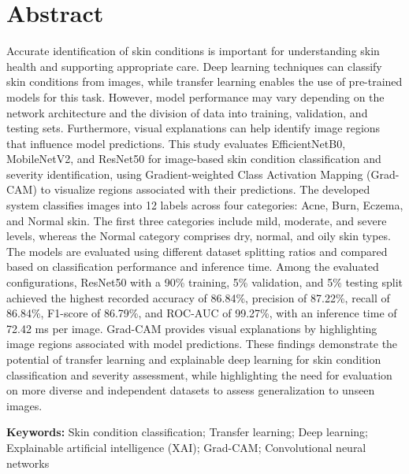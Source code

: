 \section*{Abstract}
Accurate identification of skin conditions is important for understanding skin health and supporting appropriate care. Deep learning techniques can classify skin conditions from images, while transfer learning enables the use of pre-trained models for this task. However, model performance may vary depending on the network architecture and the division of data into training, validation, and testing sets. Furthermore, visual explanations can help identify image regions that influence model predictions. This study evaluates EfficientNetB0, MobileNetV2, and ResNet50 for image-based skin condition classification and severity identification, using Gradient-weighted Class Activation Mapping (Grad-CAM) to visualize regions associated with their predictions. The developed system classifies images into 12 labels across four categories: Acne, Burn, Eczema, and Normal skin. The first three categories include mild, moderate, and severe levels, whereas the Normal category comprises dry, normal, and oily skin types. The models are evaluated using different dataset splitting ratios and compared based on classification performance and inference time. Among the evaluated configurations, ResNet50 with a 90\% training, 5\% validation, and 5\% testing split achieved the highest recorded accuracy of 86.84\%, precision of 87.22\%, recall of 86.84\%, F1-score of 86.79\%, and ROC-AUC of 99.27\%, with an inference time of 72.42 ms per image. Grad-CAM provides visual explanations by highlighting image regions associated with model predictions. These findings demonstrate the potential of transfer learning and explainable deep learning for skin condition classification and severity assessment, while highlighting the need for evaluation on more diverse and independent datasets to assess generalization to unseen images.
\\
\vspace{1cm}

\textbf{Keywords:} Skin condition classification; Transfer learning; Deep learning; Explainable artificial intelligence (XAI); Grad-CAM; Convolutional neural networks
\pagebreak
